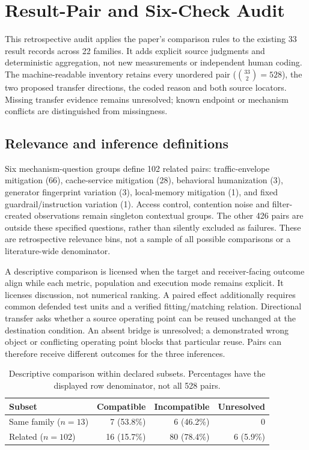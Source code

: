 \section{Result-Pair and Six-Check Audit}\label{app:result-audit}
This retrospective audit applies the paper's comparison rules to the existing 33 result records across 22 families. It adds explicit source judgments and deterministic aggregation, not new measurements or independent human coding. The machine-readable inventory retains every unordered pair ($\binom{33}{2}=528$), the two proposed transfer directions, the coded reason and both source locators. Missing transfer evidence remains unresolved; known endpoint or mechanism conflicts are distinguished from missingness.

\subsection{Relevance and inference definitions}
Six mechanism-question groups define 102 related pairs: traffic-envelope mitigation (66), cache-service mitigation (28), behavioral humanization (3), generator fingerprint variation (3), local-memory mitigation (1), and fixed guardrail/instruction variation (1). Access control, contention noise and filter-created observations remain singleton contextual groups. The other 426 pairs are outside these specified questions, rather than silently excluded as failures. These are retrospective relevance bins, not a sample of all possible comparisons or a literature-wide denominator.

A descriptive comparison is licensed when the target and receiver-facing outcome align while each metric, population and execution mode remains explicit. It licenses discussion, not numerical ranking. A paired effect additionally requires common defended test units and a verified fitting/matching relation. Directional transfer asks whether a source operating point can be reused unchanged at the destination condition. An absent bridge is unresolved; a demonstrated wrong object or conflicting operating point blocks that particular reuse. Pairs can therefore receive different outcomes for the three inferences.

\begin{table}[t]\centering\footnotesize
\caption{Descriptive comparison within declared subsets. Percentages have the displayed row denominator, not all 528 pairs.}\label{tab:pair-descriptive}
\begin{tabularx}{\columnwidth}{@{}Yrrr@{}}\toprule
Subset & Compatible & Incompatible & Unresolved\\\midrule
Same family ($n=13$) &7 (53.8\%)&6 (46.2\%)&0\\
Related ($n=102$) &16 (15.7\%)&80 (78.4\%)&6 (5.9\%)\\\bottomrule
\end{tabularx}\end{table}

